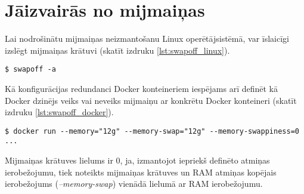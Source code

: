 \section{Jāizvairās no mijmaiņas}
Lai nodrošinātu mijmaiņas neizmantošanu Linux operētājsistēmā, var īslaicīgi
izslēgt mijmaiņas krātuvi (skatīt izdruku \ref{lst:swapoff_linux}).
\begin{lstlisting}[caption={Mijmaiņas krātuves izslēgšana Linux operētājsistēmā},
  captionpos=b,
    label=lst:swapoff_linux]
$ swapoff -a
\end{lstlisting}

Kā konfigurācijas redundanci Docker konteineriem iespējams arī definēt kā 
Docker dzinējs veiks vai neveiks mijmaiņu ar konkrētu Docker konteineri (skatīt
izdruku \ref{lst:swapoff_docker}).

\begin{lstlisting}[caption={Mijmaiņas krātuves izlēgšana Docker konteinerim},
    label=lst:swapoff_docker,
  captionpos=b
    ]
$ docker run --memory="12g" --memory-swap="12g" --memory-swappiness=0 ...
\end{lstlisting}
Mijmaiņas krātuves lielums ir 0, ja, izmantojot iepriekš definēto atmiņas
ierobežojumu, tiek noteikts mijmaiņas krātuves un RAM atmiņas kopējais
ierobežojums (\textit{--memory-swap}) vienādā lielumā ar RAM ierobežojumu.

